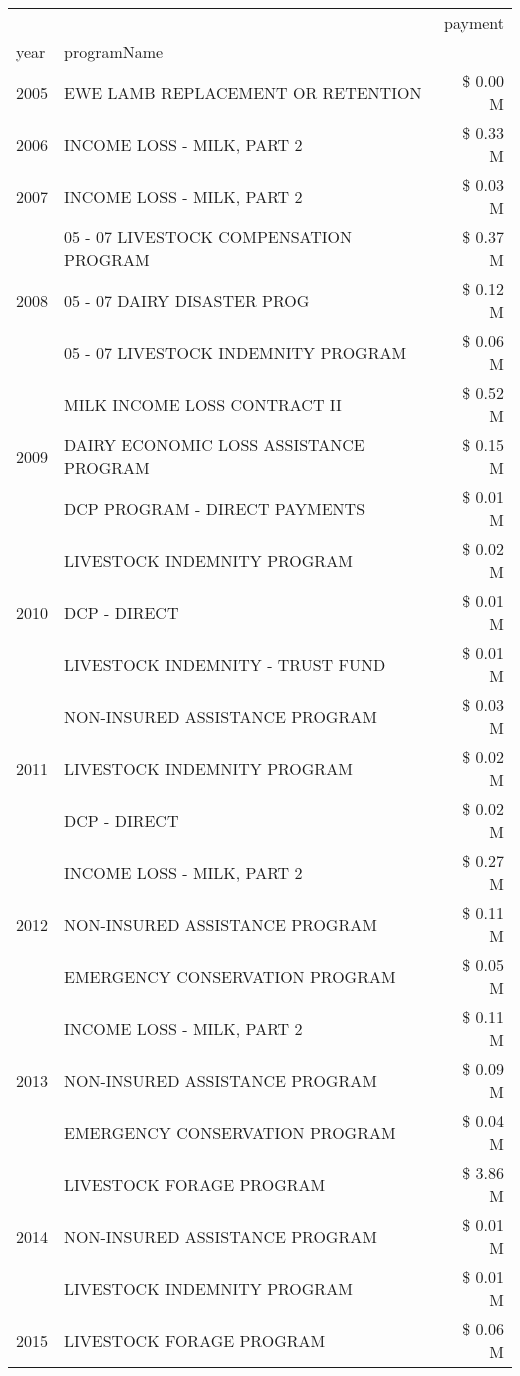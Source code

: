 \begin{tabular}{llr}
\toprule
 &  & payment \\
year & programName &  \\
\midrule
2005 & EWE LAMB REPLACEMENT OR RETENTION & \$ 0.00 M \\
\cline{1-3}
2006 & INCOME LOSS - MILK, PART 2 & \$ 0.33 M \\
\cline{1-3}
2007 & INCOME LOSS - MILK, PART 2 & \$ 0.03 M \\
\cline{1-3}
\multirow[t]{3}{*}{2008} & 05 - 07 LIVESTOCK COMPENSATION PROGRAM & \$ 0.37 M \\
 & 05 - 07 DAIRY DISASTER PROG & \$ 0.12 M \\
 & 05 - 07 LIVESTOCK INDEMNITY PROGRAM & \$ 0.06 M \\
\cline{1-3}
\multirow[t]{3}{*}{2009} & MILK INCOME LOSS CONTRACT II & \$ 0.52 M \\
 & DAIRY ECONOMIC LOSS ASSISTANCE PROGRAM & \$ 0.15 M \\
 & DCP PROGRAM - DIRECT PAYMENTS & \$ 0.01 M \\
\cline{1-3}
\multirow[t]{3}{*}{2010} & LIVESTOCK INDEMNITY PROGRAM & \$ 0.02 M \\
 & DCP - DIRECT & \$ 0.01 M \\
 & LIVESTOCK INDEMNITY - TRUST FUND & \$ 0.01 M \\
\cline{1-3}
\multirow[t]{3}{*}{2011} & NON-INSURED ASSISTANCE PROGRAM & \$ 0.03 M \\
 & LIVESTOCK INDEMNITY PROGRAM & \$ 0.02 M \\
 & DCP - DIRECT & \$ 0.02 M \\
\cline{1-3}
\multirow[t]{3}{*}{2012} & INCOME LOSS - MILK, PART 2 & \$ 0.27 M \\
 & NON-INSURED ASSISTANCE PROGRAM & \$ 0.11 M \\
 & EMERGENCY CONSERVATION PROGRAM & \$ 0.05 M \\
\cline{1-3}
\multirow[t]{3}{*}{2013} & INCOME LOSS - MILK, PART 2 & \$ 0.11 M \\
 & NON-INSURED ASSISTANCE PROGRAM & \$ 0.09 M \\
 & EMERGENCY CONSERVATION PROGRAM & \$ 0.04 M \\
\cline{1-3}
\multirow[t]{3}{*}{2014} & LIVESTOCK FORAGE PROGRAM & \$ 3.86 M \\
 & NON-INSURED ASSISTANCE PROGRAM & \$ 0.01 M \\
 & LIVESTOCK INDEMNITY PROGRAM & \$ 0.01 M \\
\cline{1-3}
\multirow[t]{3}{*}{2015} & LIVESTOCK FORAGE PROGRAM & \$ 0.06 M \\

\end{tabular}
